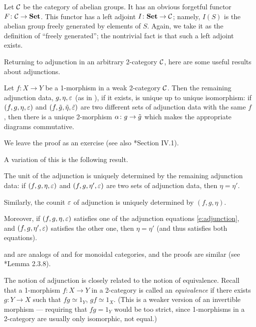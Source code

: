 \begin{example}\label{x:abelian-groups-duality}
  Let $\mathcal{C}$ be the category of abelian groups. It has an obvious forgetful
  functor $F\colon \mathcal{C}\to\mathbf{Set}$. This functor has a left adjoint
  $I\colon\mathbf{Set}\to \mathcal{C}$; namely, $I(S)$ is the abelian group freely generated
  by elements of $S$. Again, we take it as the definition of ``freely
  generated''; the nontrivial fact is that such a left adjoint exists.
\end{example}


Returning to adjunction in an arbitrary 2-category $\mathcal{C}$,
here are some useful results about adjunctions.

\begin{lemma}\label{l:adjunction-unique}
  Let $f\colon X\to Y$ be a 1-morphism in a weak 2-category $\mathcal{C}$. Then
  the remaining adjunction data, $g, \eta, \varepsilon$ \textup{(}as in
  \textup{)}, if it exists, is unique up to unique isomorphism: if
  $(f,g,\eta,\varepsilon)$ and $(f, \tilde g, \tilde \eta, \tilde {\varepsilon})$ are two
  different sets of adjunction data with the same $f$, then there is a
  unique 2-morphism $\alpha\colon g\to \tilde g$ which makes the appropriate
  diagrams commutative.
\end{lemma}
We leave the proof as an exercise (see also *{Section IV.1}).

A variation of this is the following result.
\begin{lemma}\label{l:adjunction-unique2}
  The unit of the adjunction is uniquely determined by the remaining
  adjunction data: if $(f, g, \eta, \varepsilon)$ and $(f, g, \eta', \varepsilon)$ are two
  sets of adjunction data, then
  $\eta=\eta'$.

  Similarly, the counit $\varepsilon$ of adjunction is uniquely determined by
  $(f,g, \eta)$.

  Moreover, if $(f, g, \eta, \varepsilon)$ satisfies one of the adjunction equations
  \eqref{e:adjunction}, and $(f, g, \eta', \varepsilon)$ satisfies the other one,
  then $\eta=\eta'$ \textup{(}and thus satisfies both equations\textup{)}.
\end{lemma}
 and  are analogs of
 and  for monoidal categories,
and the proofs are similar (see *{Lemma 2.3.8}).



The notion of adjunction is closely related to the notion of equivalence. Recall
that a 1-morphism $f\colon X\to Y$ in a 2-category is called an
\emph{equivalence} if there exists $g\colon
Y\to X$ such that $fg\simeq 1_Y$, $gf\simeq 1_X$. (This is a weaker version of
an invertible morphism --- requiring that $fg=1_Y$ would be too strict, since
1-morphisms in a 2-category are usually only isomorphic, not equal.)

